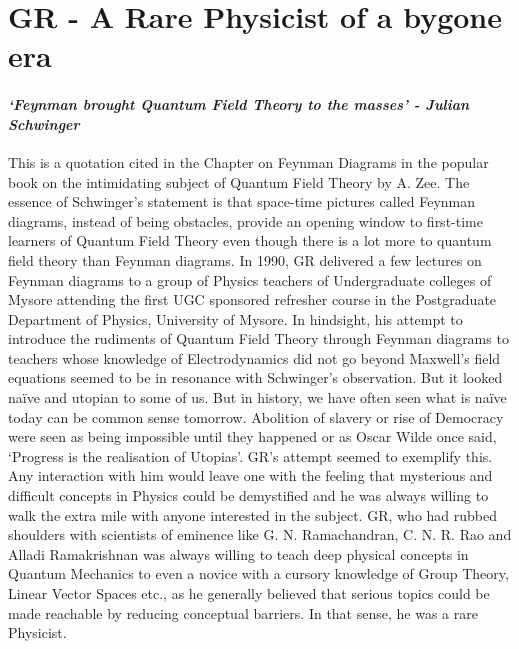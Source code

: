 \chapter{GR - A Rare Physicist of a bygone era}\label{chap15}

\lhead[\small\thepage]{\small\leftmark}

\subsubsection*{\textit{`Feynman brought Quantum Field Theory to the masses' - Julian Schwinger}}

This is a quotation cited in the Chapter on Feynman Diagrams in the popular book on the intimidating subject of Quantum Field Theory by A. Zee. The essence of Schwinger's statement is that space-time pictures called Feynman diagrams, instead of being obstacles, provide an opening window to first-time learners of Quantum Field Theory even though there is a lot more to quantum field theory than Feynman diagrams. In 1990, GR delivered a few lectures on Feynman diagrams to a group of Physics teachers of Undergraduate colleges of Mysore attending the first UGC sponsored refresher course in the Postgraduate Department of Physics, University of Mysore. In hindsight, his attempt to introduce the rudiments of Quantum Field Theory through Feynman diagrams to teachers whose knowledge of Electrodynamics did not go beyond Maxwell's field equations seemed to be in resonance with Schwinger's observation. But it looked na\"{i}ve and utopian to some of us. But in history, we have often seen what is na\"{i}ve today can be common sense tomorrow. Abolition of slavery or rise of Democracy were seen as being impossible until they happened or as Oscar Wilde once said, `Progress is the realisation of Utopias'. GR's attempt seemed to exemplify this. Any interaction with him would leave one with the feeling that mysterious and difficult concepts in Physics could be demystified and he was always willing to walk the extra mile with anyone interested in the subject. GR, who had rubbed shoulders with scientists of eminence like G. N. Ramachandran, C. N. R. Rao and Alladi Ramakrishnan was always willing to teach deep physical concepts in Quantum Mechanics to even a novice with a cursory knowledge of Group Theory,  Linear Vector Spaces etc., as he generally believed that serious topics could be made reachable by reducing conceptual barriers. In that sense, he was a rare Physicist.

